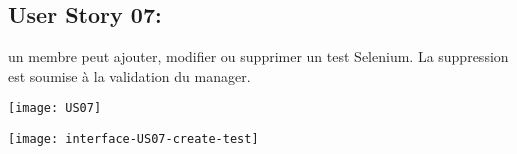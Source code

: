 \newpage{}
\subsection{User Story 07:}
un membre peut ajouter, modifier ou supprimer un test Selenium. La suppression est soumise à la validation
du manager.


  \begin{center}
        \texttt{[image: US07]}
  \end{center}

\newpage{}
  \begin{center}
        \texttt{[image: interface-US07-create-test]}
  \end{center}